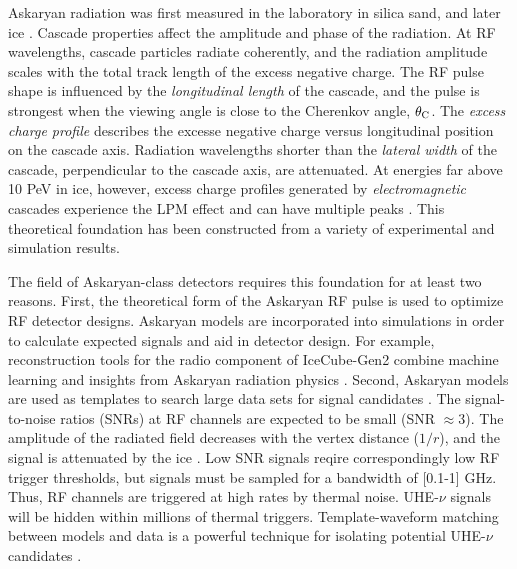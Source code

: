 \documentclass[amsmath,amssymb,aps,prd,10pt,twocolumn]{revtex4}
\begin{document}
Askaryan radiation was first measured in the laboratory in silica sand, and later ice \cite{saltzberg,10.1103/PhysRevD.74.043002,ask_ice}.  Cascade properties affect the amplitude and phase of the radiation.  At RF wavelengths, cascade particles radiate coherently, and the radiation amplitude scales with the total track length of the excess negative charge.  The RF pulse shape is influenced by the \textit{longitudinal length} of the cascade, and the pulse is strongest when the viewing angle is close to the Cherenkov angle, $\theta_{\rm C}$.  The \textit{excess charge profile} describes the excesse negative charge versus longitudinal position on the cascade axis.  Radiation wavelengths shorter than the \textit{lateral width} of the cascade, perpendicular to the cascade axis, are attenuated.  At energies far above 10 PeV in ice, however, excess charge profiles generated by \textit{electromagnetic} cascades experience the LPM effect and can have multiple peaks \cite{10.1016/j.astropartphys.2009.06.005,10.1103/physrevd.82.074017}.  This theoretical foundation has been constructed from a variety of experimental and simulation results.

The field of Askaryan-class detectors requires this foundation for at least two reasons.  First, the theoretical form of the Askaryan RF pulse is used to optimize RF detector designs.  Askaryan models are incorporated into simulations \cite{dookayka2011characterizing,testbed,10.1140/epjc/s10052-020-7612-8} in order to calculate expected signals and aid in detector design.  For example, reconstruction tools for the radio component of IceCube-Gen2 combine machine learning and insights from Askaryan radiation physics \cite{10.1140/epjc/s10052-019-6971-5,10.1088/1748-0221/15/09/p09039,IFT}.  Second, Askaryan models are used as templates to search large data sets for signal candidates \cite{10.1088/1475-7516/2020/03/053,10.1016/j.astropartphys.2014.09.002}.  The signal-to-noise ratios (SNRs) at RF channels are expected to be small (SNR $\approx 3$).  The amplitude of the radiated field decreases with the vertex distance ($1/r$), and the signal is attenuated by the ice \cite{10.3189/2015jog14j214,Barwick:2018497,ALLISON201963}.  Low SNR signals reqire correspondingly low RF trigger thresholds, but signals must be sampled for a bandwidth of [0.1-1] GHz.  Thus, RF channels are triggered at high rates by thermal noise.  UHE-$\nu$ signals will be hidden within millions of thermal triggers.  Template-waveform matching between models and data is a powerful technique for isolating potential UHE-$\nu$ candidates \cite{10.1016/j.astropartphys.2015.04.002,10.1016/j.astropartphys.2014.09.002}.
\end{document}
